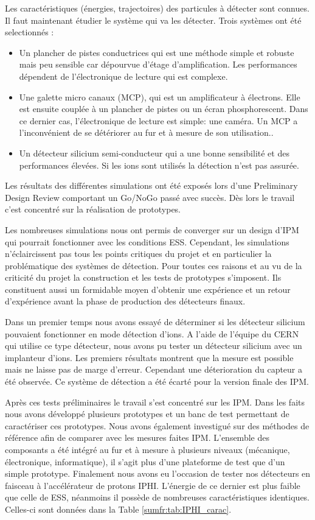 Les caractéristiques (énergies, trajectoires) des particules à détecter sont connues. Il faut maintenant étudier le système qui va les détecter. Trois systèmes ont été selectionnés :
\begin{itemize}
  \item Un plancher de pistes conductrices qui est une méthode simple et robuste mais peu sensible car dépourvue d'étage d'amplification. Les performances dépendent de l'électronique de lecture qui est complexe.
  \item Une galette micro canaux  (MCP), qui est un amplificateur à électrons. Elle est ensuite couplée à un plancher de pistes ou un écran phosphorescent. Dans ce dernier cas, l'électronique de lecture est simple: une caméra. Un MCP a l'inconvénient de se détériorer au fur et à mesure de son utilisation..
  \item Un détecteur silicium semi-conducteur qui a une bonne sensibilité et des performances élevées. Si les ions sont utilisés la détection n'est pas assurée.
\end{itemize}
Les résultats des différentes simulations ont été exposés lors d'une Preliminary Design Review comportant un Go/NoGo passé avec succès. Dès lors le travail c'est concentré sur la réalisation de prototypes.

Les nombreuses simulations nous ont permis de converger sur un design d’IPM qui pourrait fonctionner avec les conditions ESS. Cependant, les simulations n'éclaircissent pas tous les points critiques du projet et en particulier la problématique des systèmes de détection. Pour toutes ces raisons et au vu de la criticité du projet la construction et les tests de prototypes s'imposent. Ils constituent aussi un formidable moyen d'obtenir une expérience et un retour d'expérience avant la phase de production des détecteurs finaux.


Dans un premier temps nous avons essayé de déterminer si les détecteur silicium pouvaient fonctionner en mode détection d’ions. A l’aide de l’équipe du CERN qui utilise ce type détecteur, nous avons pu tester un détecteur silicium avec un implanteur d’ions. Les premiers résultats montrent que la mesure est possible mais ne laisse pas de marge d'erreur. Cependant une déterioration du capteur a été observée. Ce système de détection a été écarté pour la version finale des IPM.


Après ces tests préliminaires le travail s'est concentré sur les IPM. Dans les faits nous avons développé plusieurs prototypes et un banc de test permettant de caractériser ces prototypes. Nous avons également investigué sur des méthodes de référence afin de comparer avec les mesures faites IPM. L’ensemble des composants a été intégré au fur et à mesure à plusieurs niveaux (mécanique, électronique, informatique), il s’agit plus d’une plateforme de test que d’un simple prototype. Finalement nous avons eu l'occasion de tester nos détecteurs en faisceau à l'accélérateur de protons IPHI. L'énergie de ce dernier est plus faible que celle de ESS, néanmoins il possède de nombreuses caractéristiques identiques. Celles-ci sont données dans la Table \ref{sumfr:tab:IPHI_carac}.

